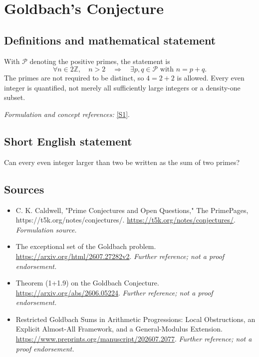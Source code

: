 \documentclass[11pt]{article}
\begin{document}
\section*{\texorpdfstring{Goldbach's Conjecture}{Goldbach's Conjecture}}\label{12}
\subsection{Definitions and mathematical statement}
With $\mathcal P$ denoting the positive primes, the statement is
\[
 \forall n\in2{\mathbb{Z}},\quad n>2\quad\Longrightarrow\quad
 \exists p,q\in\mathcal P\text{ with }n=p+q.
\]
The primes are not required to be distinct, so $4=2+2$ is allowed. Every even integer is quantified, not merely all sufficiently large integers or a density-one subset.
\par\smallskip\textit{Formulation and concept references:} \href{https://t5k.org/notes/conjectures/}{[S1]}.

\subsection{Short English statement}
Can every even integer larger than two be written as the sum of two primes?
\subsection{Sources}
\begin{itemize}
\item[S1]C. K. Caldwell, "Prime Conjectures and Open Questions," The PrimePages, https://t5k.org/notes/conjectures/.
\url{https://t5k.org/notes/conjectures/}.
\textit{Formulation source.}
\item[S2]The exceptional set of the Goldbach problem.
\url{https://arxiv.org/html/2607.27282v2}.
\textit{Further reference; not a proof endorsement.}
\item[S3]Theorem (1+1.9) on the Goldbach Conjecture.
\url{https://arxiv.org/abs/2606.05224}.
\textit{Further reference; not a proof endorsement.}
\item[S4]Restricted Goldbach Sums in Arithmetic Progressions: Local Obstructions, an Explicit Almost-All Framework, and a General-Modulus Extension.
\url{https://www.preprints.org/manuscript/202607.2077}.
\textit{Further reference; not a proof endorsement.}
\end{itemize}
\end{document}
